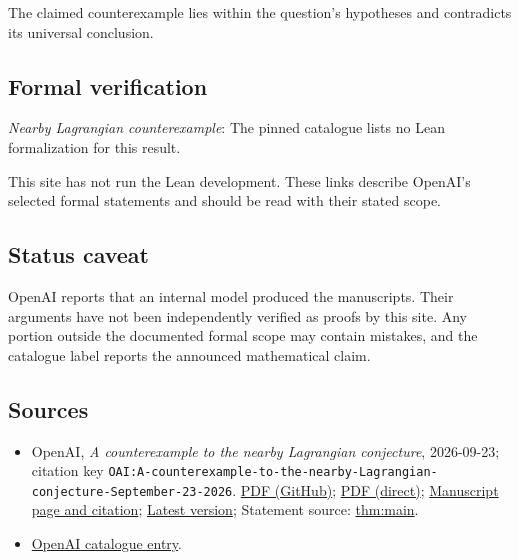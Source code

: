 \documentclass[11pt]{article}
\begin{document}
The claimed counterexample lies within the question’s hypotheses and contradicts its universal conclusion.

\subsection{Formal verification}
\textit{Nearby Lagrangian counterexample}: The pinned catalogue lists no Lean formalization for this result.

This site has not run the Lean development. These links describe OpenAI’s selected formal statements and should be read with their stated scope.

\subsection{Status caveat}
OpenAI reports that an internal model produced the manuscripts. Their arguments have not been independently verified as proofs by this site. Any portion outside the documented formal scope may contain mistakes, and the catalogue label reports the announced mathematical claim.

\subsection{Sources}
\begin{itemize}
\item OpenAI, \emph{A counterexample to the nearby Lagrangian conjecture}, 2026-09-23; citation key \texttt{OAI:A-counterexample-to-the-nearby-Lagrangian-conjecture-September-23-2026}. \href{https://github.com/openai/math/blob/adc7f1241b42e322a6451854ab7e4b4c146bf78a/preprints/A-counterexample-to-the-nearby-Lagrangian-conjecture-September-23-2026/paper.pdf}{PDF (GitHub)}; \href{https://github.com/openai/math/raw/adc7f1241b42e322a6451854ab7e4b4c146bf78a/preprints/A-counterexample-to-the-nearby-Lagrangian-conjecture-September-23-2026/paper.pdf}{PDF (direct)}; \href{https://github.com/openai/math/blob/adc7f1241b42e322a6451854ab7e4b4c146bf78a/preprints/A-counterexample-to-the-nearby-Lagrangian-conjecture-September-23-2026/README.md}{Manuscript page and citation}; \href{https://github.com/openai/math/blob/main/preprints/A-counterexample-to-the-nearby-Lagrangian-conjecture-September-23-2026/paper.pdf}{Latest version}; Statement source: \href{https://github.com/openai/math/blob/adc7f1241b42e322a6451854ab7e4b4c146bf78a/preprints/A-counterexample-to-the-nearby-Lagrangian-conjecture-September-23-2026/build/sections/introduction.tex\#L25}{thm:main}.
\item \href{https://github.com/openai/math/blob/adc7f1241b42e322a6451854ab7e4b4c146bf78a/CONTENTS.md}{OpenAI catalogue entry}.
\end{itemize}
\end{document}
